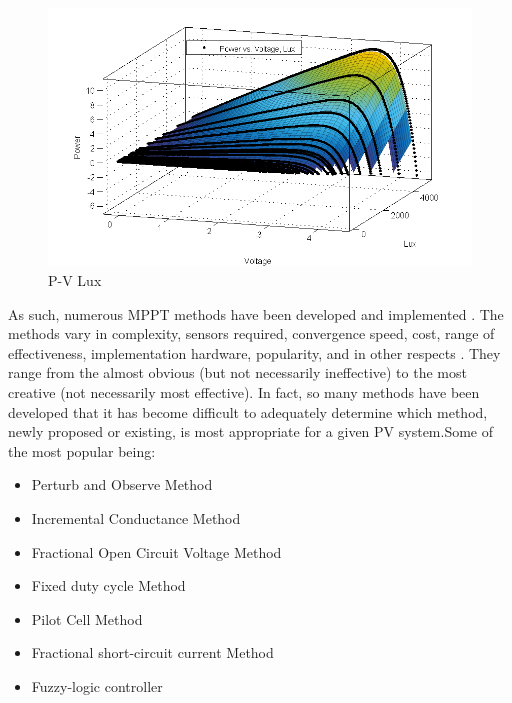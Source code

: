   \begin{figure}[H]
  \begin{center}
  \includegraphics[width=\textwidth]{images/PV_LUX}
  \caption{ P-V Lux}
  \label{fig:PVgraph}
  \end{center}
  \end{figure}

As such, numerous \ac{MPPT} methods have been developed and implemented\cite{ngan2011study} \cite{esram2007comparison} \cite{eltawil2013mppt} . The methods vary in complexity, sensors required, convergence speed, cost, range of effectiveness, implementation hardware, popularity, and in other respects\cite{reza2013classification} \cite{dondi2008modeling}. They range from the almost obvious (but not necessarily ineffective) to the most creative (not necessarily most effective). In fact, so many methods have been developed that it has become difficult to adequately determine which method, newly proposed or existing, is most appropriate for a given PV system.Some of the most popular being: \\

  
\begin{itemize}
 \item Perturb and Observe Method
 \item Incremental Conductance Method
 \item Fractional Open Circuit Voltage Method
 \item Fixed duty cycle Method
 \item Pilot Cell Method
 \item Fractional short-circuit current Method
 \item Fuzzy-logic controller
\end {itemize}
 

